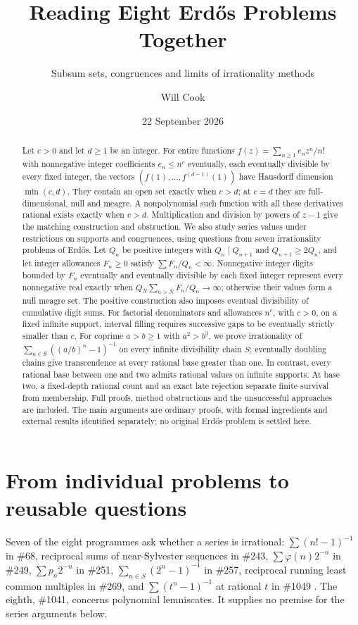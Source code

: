 \documentclass[11pt]{article}
\title{Reading Eight Erd\H{o}s Problems Together}
\subtitle{Subsum sets, congruences and limits of irrationality methods}
\author{Will Cook}
\date{22 September 2026}
\begin{document}
\maketitle
\noteprovenance
\begin{abstract}
Let $c>0$ and let $d\ge1$ be an integer. For entire functions
$f(z)=\sum_{n\ge1}e_nz^n/n!$ with nonnegative integer
coefficients $e_n\le n^c$ eventually, each eventually divisible by every fixed
integer, the vectors $(f(1),\ldots,f^{(d-1)}(1))$ have Hausdorff dimension
$\min(c,d)$. They contain an open set exactly when $c>d$; at $c=d$ they are
full-dimensional, null and meagre. A nonpolynomial such function with all
these derivatives rational exists exactly when $c>d$. Multiplication and
division by powers of $z-1$ give the matching construction and obstruction.
We also study series values under restrictions on supports and congruences,
using questions from seven irrationality problems of Erd\H{o}s. Let $Q_n$ be
positive integers with $Q_n\mid Q_{n+1}$ and $Q_{n+1}\ge2Q_n$, and let integer
allowances $F_n\ge0$ satisfy $\sum F_n/Q_n<\infty$. Nonnegative integer digits
bounded by $F_n$ eventually and eventually divisible by each fixed integer
represent every nonnegative real exactly when
$Q_N\sum_{n>N}F_n/Q_n\to\infty$; otherwise their values form a null meagre set.
The positive construction also imposes eventual divisibility of cumulative
digit sums. For factorial denominators and allowances $n^c$, with $c>0$,
on a fixed infinite support, interval filling requires successive gaps to be eventually
strictly smaller than $c$.
For coprime $a>b\ge1$ with $a^2>b^3$, we prove irrationality of
$\sum_{n\in S}((a/b)^n-1)^{-1}$ on every infinite divisibility chain $S$;
eventually doubling chains give transcendence at every rational base greater
than one. In contrast, every rational base between one and two admits rational
values on infinite supports. At base two, a fixed-depth rational count and an
exact late rejection separate finite survival from membership. Full proofs,
method obstructions and the unsuccessful approaches are included. The main
arguments are ordinary proofs, with formal ingredients and external results
identified separately; no original Erd\H{o}s problem is settled here.
\end{abstract}

\section{From individual problems to reusable questions}\label{sec:map}
Seven of the eight programmes ask whether a series is irrational:
$\sum(n!-1)^{-1}$ in \#68, reciprocal sums of near-Sylvester sequences in
\#243, $\sum\varphi(n)2^{-n}$ in \#249, $\sum p_n2^{-n}$ in \#251,
$\sum_{n\in S}(2^n-1)^{-1}$ in \#257, reciprocal running least common
multiples in \#269, and $\sum(t^n-1)^{-1}$ at rational $t$ in \#1049
\cite{erdosgraham1980,erdos1988}. The eighth, \#1041, concerns polynomial
lemniscates. It supplies no premise for the series arguments below.
\end{document}
